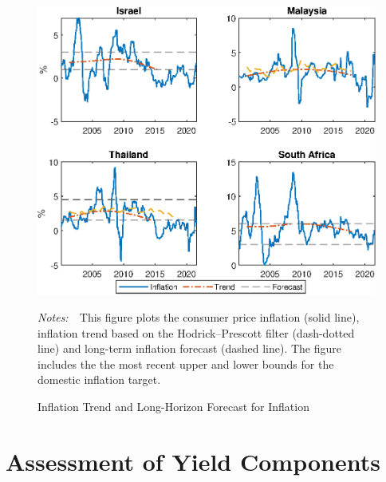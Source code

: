 \documentclass[a4paper, 12pt]{article}
\newcommand{\figtext}[1]{
	\vspace{-1ex}
	\captionsetup{justification=justified,font=footnotesize}
	\caption*{#1}
}
\newcommand{\fignotes}[1]{\figtext{\emph{Notes:~}~#1}}
\begin{document}
\begin{appendices}
	\begin{landscape}
		\begin{figure}[tbph]
			\caption{Inflation Trend and Long-Horizon Forecast for Inflation} \label{fig:CPI_ILSZAR}
			\begin{center}								%
				\begin{minipage}{0.9\linewidth}
					\begin{center}							%
						\includegraphics[trim={0cm 0cm 0cm 0cm},clip,height=0.8\textheight,width=1\textwidth]{../Figures/CPI_ILSZAR.eps} \\
					\end{center}
					\fignotes{This figure plots the consumer price inflation (solid line), inflation trend based on the Hodrick--Prescott filter (dash-dotted line) and long-term inflation forecast (dashed line). The figure includes the the most recent upper and lower bounds for the domestic inflation target.}
				\end{minipage}
			\end{center}
		\end{figure}
	\end{landscape}
	
	
	\renewcommand\thefigure{\thesection.\arabic{figure}}
	\renewcommand\thetable{\thesection.\arabic{table}}
	\section{Assessment of Yield Components} \label{sec:assessment}
	\setcounter{figure}{0}
	\setcounter{table}{0}
	\setcounter{footnote}{0}
	\setcounter{equation}{0}
	

\end{appendices}
\end{document}
